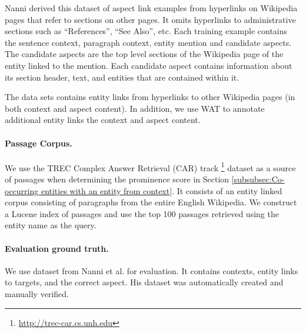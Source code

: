 Nanni derived this dataset of aspect link examples from hyperlinks on Wikipedia pages that refer to sections on other pages.  It omits hyperlinks to administrative sections such as ``References'', ``See Also'', etc. Each training example contains the sentence context, paragraph context, entity mention and candidate aspects. The candidate aspects are the top level sections of the Wikipedia page of the entity linked to the mention. 
Each candidate aspect contains information about its section header, text, and entities that are contained within it.

The data sets contains entity links from hyperlinks to other Wikipedia pages (in both context and aspect content). In addition, we use WAT \cite{piccinno2014wat} to annotate additional entity links the context and aspect content.


\paragraph{\textbf{Passage Corpus.}}
We use the TREC Complex Answer Retrieval (CAR) track \cite{dietz2018trec}\footnote{\url{http://trec-car.cs.unh.edu}} dataset as a source of passages when determining the prominence score in Section \ref{subsubsec:Co-occurring entities with an entity from context}. It consists of an entity linked corpus consisting of paragraphs from the entire English Wikipedia. We construct a Lucene index of passages and use the top 100 passages retrieved using the entity name as the query.


    
    


\paragraph{\textbf{Evaluation ground truth.}}
We use dataset from Nanni et al. \cite{nanni2018entity} for evaluation. It contains contexts, entity links to targets, and the correct aspect. His dataset was automatically created and manually verified. %
%


